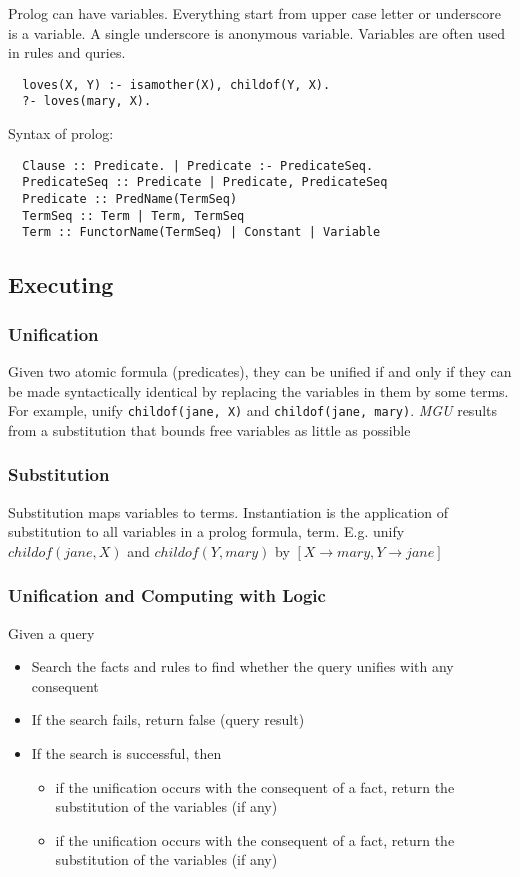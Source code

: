 Prolog can have variables. Everything start from upper case letter or
underscore is a variable. A single underscore is anonymous
variable. Variables are often used in rules and quries.
\begin{lstlisting}
  loves(X, Y) :- isamother(X), childof(Y, X).
  ?- loves(mary, X).
\end{lstlisting}

Syntax of prolog:
\begin{lstlisting}
  Clause :: Predicate. | Predicate :- PredicateSeq.
  PredicateSeq :: Predicate | Predicate, PredicateSeq
  Predicate :: PredName(TermSeq)
  TermSeq :: Term | Term, TermSeq
  Term :: FunctorName(TermSeq) | Constant | Variable
\end{lstlisting}

\subsection{Executing}
\subsubsection{Unification}
Given two atomic formula (predicates), they can be unified if and only
if they can be made syntactically identical by replacing the variables
in them by some terms. For example, unify \texttt{childof(jane, X)}
and \texttt{childof(jane, mary)}.  \textit{MGU} results from a
substitution that bounds free variables as little as possible

\subsubsection{Substitution}
Substitution maps variables to terms.  Instantiation is the
application of substitution to all variables in a prolog formula,
term. E.g. unify $childof(jane, X)$ and $childof(Y, mary)$ by
$[X \rightarrow mary, Y \rightarrow jane]$

\subsubsection{Unification and Computing with Logic}

Given a query
\begin{itemize}
\item Search the facts and rules to find whether the query unifies
  with any consequent
\item If the search fails, return false (query result)
\item If the search is successful, then
  \begin{itemize}
  \item if the unification occurs with the consequent of a fact,
    return the substitution of the variables (if any)
  \item if the unification occurs with the consequent of a fact,
    return the substitution of the variables (if any)
  \end{itemize}
\end{itemize}

